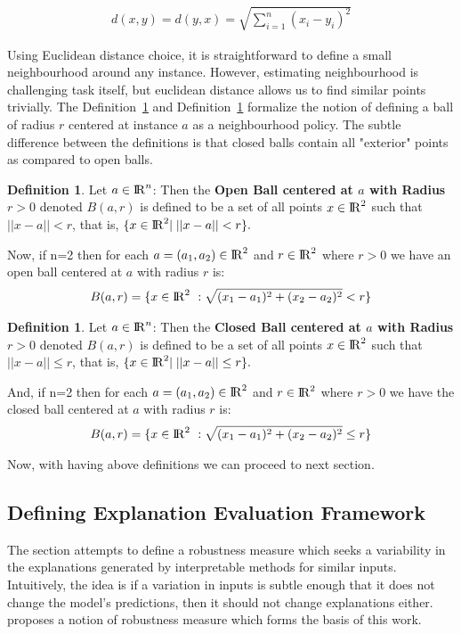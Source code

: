 \documentclass[english]{tktltiki2}
\theoremstyle{definition}
\newtheorem{definition}[thm]{Definition}
\theoremstyle{remark}
\begin{document}
\begin{align*}
d(x,y) = d(y,x) = \sqrt{\sum_{i=1}^{n}(x_i - y_i)^2}
\end{align*}

Using Euclidean distance choice, it is straightforward to define a small neighbourhood around any instance. However, estimating neighbourhood is challenging task itself, but euclidean distance allows us to find similar points trivially. The Definition~\ref{def:1} and Definition~\ref{def:2} formalize the notion of defining a ball of radius $r$ centered at instance $a$ as a neighbourhood policy. The subtle difference between the definitions is that closed balls contain all "exterior" points as compared to open balls.
\begin{definition}\label{def:1}{Let $a \in {\rm I\!R}^n$: Then the \textbf{Open Ball centered at $a$ with Radius $r > 0$} denoted $B(a,r)$ is defined to be a set of all points $x \in {\rm I\!R}^2$ such that $||x-a|| < r$, that is, $\{x \in {\rm I\!R}^2 |\;||x - a|| < r\}.$}
\end{definition}
Now, if n=2 then for each $a = (a_1,a_2) \in {\rm I\!R}^2$ and $r \in {\rm I\!R}^2$ where $r > 0$ we have an open ball centered at $a$ with radius $r$ is:
\begin{align*}
B(a,r) = \{x \in {\rm I\!R}^2\ : \sqrt{(x_1 - a_1)^2 + (x_2 - a_2)^2} < r\}
\end{align*}
\begin{definition}\label{def:2}{Let $a \in {\rm I\!R}^n$: Then the \textbf{Closed Ball centered at $a$ with Radius $r > 0$} denoted $B(a,r)$ is defined to be a set of all points $x \in {\rm I\!R}^2$ such that $||x-a|| \leq r$, that is, $\{x \in {\rm I\!R}^2 |\;||x - a|| \leq r\}.$}
\end{definition}
And, if n=2 then for each $a = (a_1,a_2) \in {\rm I\!R}^2$ and $r \in {\rm I\!R}^2$ where $r > 0$ we have the closed ball centered at $a$ with radius $r$ is:
\begin{align*}
B(a,r) = \{x \in {\rm I\!R}^2\ : \sqrt{(x_1 - a_1)^2 + (x_2 - a_2)^2} \leq r\}
\end{align*}

Now, with having above definitions we can proceed to next section.

\subsection{Defining Explanation Evaluation Framework} %
The section attempts to define a robustness measure which seeks a variability in the explanations generated by interpretable methods for similar inputs. Intuitively, the idea is if a variation in inputs is subtle enough that it does not change the model's predictions, then it should not change explanations either. \citet{alvarez2018robustness} proposes a notion of robustness measure which forms the basis of this work.
\end{document}

